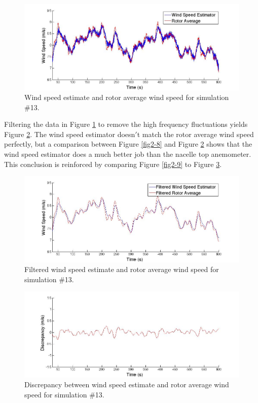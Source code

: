 \begin{figure}[htbp]
	\centering
		\includegraphics[width = \linewidth]{Figures/ch2Figures/fig2-15.jpg}
		
	\caption{Wind speed estimate and rotor average wind speed for simulation \#13.}
	\label{fig2-15}
\end{figure}


Filtering the data in Figure \ref{fig2-15} to remove the high frequency fluctuations yields Figure \ref{fig2-16}. The wind speed estimator doesn$'$t match the rotor average wind speed perfectly, but a comparison between Figure \ref{fig2-8} and Figure \ref{fig2-16} shows that the wind speed estimator does a much better job than the nacelle top anemometer. This conclusion is reinforced by comparing Figure \ref{fig2-9} to Figure \ref{fig2-17}.

\begin{figure}[ht]
	\centering
		\includegraphics[width = \linewidth]{Figures/ch2Figures/fig2-16.jpg}
		
	\caption{Filtered wind speed estimate and rotor average wind speed for simulation \#13.}
	\label{fig2-16}
\end{figure}



\begin{figure}[ht]
	\centering
		\includegraphics[width = \linewidth]{Figures/ch2Figures/fig2-17.jpg}
		
	\caption{Discrepancy between wind speed estimate and rotor average wind speed for simulation \#13.}
	\label{fig2-17}
\end{figure}

